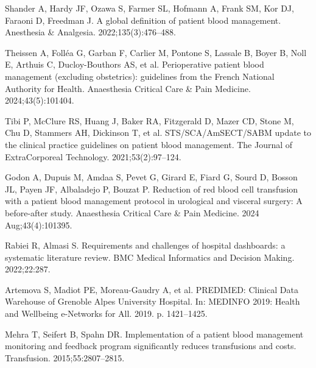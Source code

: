 \documentclass{IOS-Book-Article}
\begin{document}
\begin{thebibliography}{99}

Shander A, Hardy JF, Ozawa S, Farmer SL, Hofmann A, Frank SM, Kor DJ, Faraoni D, Freedman J. A global definition of patient blood management. Anesthesia \& Analgesia. 2022;135(3):476--488.

Theissen A, Folléa G, Garban F, Carlier M, Pontone S, Lassale B, Boyer B, Noll E, Arthuis C, Ducloy-Bouthors AS, et al. Perioperative patient blood management (excluding obstetrics): guidelines from the French National Authority for Health. Anaesthesia Critical Care \& Pain Medicine. 2024;43(5):101404.

Tibi P, McClure RS, Huang J, Baker RA, Fitzgerald D, Mazer CD, Stone M, Chu D, Stammers AH, Dickinson T, et al. STS/SCA/AmSECT/SABM update to the clinical practice guidelines on patient blood management. The Journal of ExtraCorporeal Technology. 2021;53(2):97--124.

Godon A, Dupuis M, Amdaa S, Pevet G, Girard E, Fiard G, Sourd D, Bosson JL, Payen JF, Albaladejo P, Bouzat P. Reduction of red blood cell transfusion with a patient blood management protocol in urological and visceral surgery: A before-after study. Anaesthesia Critical Care \& Pain Medicine. 2024 Aug;43(4):101395.

Rabiei R, Almasi S. Requirements and challenges of hospital dashboards: a systematic literature review. BMC Medical Informatics and Decision Making. 2022;22:287.

Artemova S, Madiot PE, Moreau-Gaudry A, et al. PREDIMED: Clinical Data Warehouse of Grenoble Alpes University Hospital. In: MEDINFO 2019: Health and Wellbeing e-Networks for All. 2019. p. 1421--1425.

Mehra T, Seifert B, Spahn DR. Implementation of a patient blood management monitoring and feedback program significantly reduces transfusions and costs. Transfusion. 2015;55:2807--2815.

\end{thebibliography}
\end{document}
